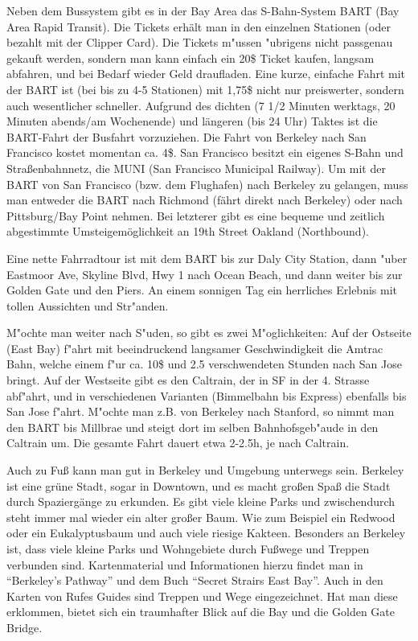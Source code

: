 \documentclass[a4paper]{scrreprt}
\begin{document}
Neben dem Bussystem gibt es in der Bay Area das S-Bahn-System BART (Bay Area Rapid Transit).
Die Tickets erhält man in den einzelnen Stationen (oder bezahlt mit der Clipper Card).
Die Tickets m"ussen "ubrigens nicht passgenau gekauft werden, sondern man kann einfach ein 20\$ Ticket kaufen, langsam abfahren, und bei Bedarf wieder Geld draufladen.
Eine kurze, einfache Fahrt mit der BART ist (bei bis zu 4-5 Stationen) mit 1,75\$ nicht nur preiswerter, sondern auch wesentlicher schneller. 
Aufgrund des dichten (7 1/2 Minuten werktags, 20 Minuten abends/am Wochenende) und längeren (bis 24 Uhr) Taktes ist die BART-Fahrt der Busfahrt vorzuziehen. 
Die Fahrt von Berkeley nach San Francisco kostet momentan ca. 4\$. 
San Francisco besitzt ein eigenes S-Bahn und Straßenbahnnetz, die MUNI (San Francisco Municipal
Railway). 
Um mit der BART von San Francisco (bzw. dem Flughafen) nach Berkeley zu gelangen, muss man entweder die BART nach Richmond (fährt direkt nach Berkeley) oder nach Pittsburg/Bay Point nehmen. 
Bei letzterer gibt es eine bequeme und zeitlich abgestimmte Umsteigemöglichkeit an 19th Street Oakland (Northbound).

Eine nette Fahrradtour ist mit dem BART bis zur Daly City Station, dann "uber Eastmoor Ave, Skyline Blvd, Hwy 1 nach Ocean Beach, und dann weiter bis zur Golden Gate und den Piers.
An einem sonnigen Tag ein herrliches Erlebnis mit tollen Aussichten und Str"anden.

M"ochte man weiter nach S"uden, so gibt es zwei M"oglichkeiten: Auf der Ostseite (East Bay) f"ahrt mit beeindruckend langsamer Geschwindigkeit die Amtrac Bahn, welche einem f"ur ca. 10\$ und 2.5 verschwendeten Stunden nach San Jose bringt.
Auf der Westseite gibt es den Caltrain, der in SF in der 4. Strasse abf"ahrt, und in verschiedenen Varianten (Bimmelbahn bis Express) ebenfalls bis San Jose f"ahrt.
M"ochte man z.B. von Berkeley nach Stanford, so nimmt man den BART bis Millbrae und steigt dort im selben Bahnhofsgeb"aude in den Caltrain um.
Die gesamte Fahrt dauert etwa 2-2.5h, je nach Caltrain.

Auch zu Fuß kann man gut in Berkeley und Umgebung unterwegs sein. 
Berkeley ist eine grüne Stadt, sogar in Downtown, und es macht großen Spaß die Stadt durch Spaziergänge zu erkunden. 
Es gibt viele kleine Parks und zwischendurch steht immer mal wieder ein alter großer Baum. 
Wie zum Beispiel ein Redwood oder ein Eukalyptusbaum und auch viele riesige Kakteen. 
Besonders an Berkeley ist, dass viele kleine Parks und Wohngebiete durch Fußwege und Treppen verbunden sind. 
Kartenmaterial und Informationen hierzu findet man in ``Berkeley's Pathway'' und dem Buch ``Secret Strairs East Bay''. 
Auch in den Karten von Rufes Guides sind Treppen und Wege eingezeichnet. 
Hat man diese erklommen, bietet sich ein traumhafter Blick auf die Bay und die Golden Gate Bridge.
\end{document}
